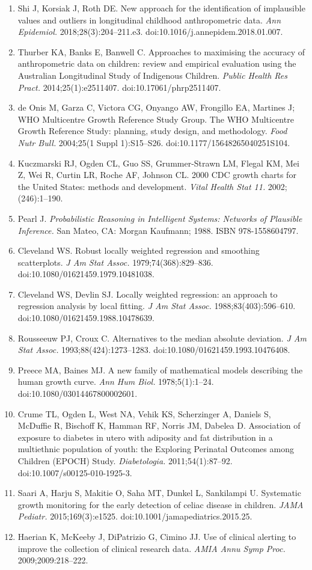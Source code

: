 \documentclass[11pt]{article}
\begin{document}
\begin{enumerate}
\item
  Shi J, Korsiak J, Roth DE. New approach for the identification of implausible values and outliers in longitudinal childhood anthropometric data. \emph{Ann Epidemiol.} 2018;28(3):204--211.e3. doi:10.1016/j.annepidem.2018.01.007.
\item
  Thurber KA, Banks E, Banwell C. Approaches to maximising the accuracy of anthropometric data on children: review and empirical evaluation using the Australian Longitudinal Study of Indigenous Children. \emph{Public Health Res Pract.} 2014;25(1):e2511407. doi:10.17061/phrp2511407.
\item
  de Onis M, Garza C, Victora CG, Onyango AW, Frongillo EA, Martines J; WHO Multicentre Growth Reference Study Group. The WHO Multicentre Growth Reference Study: planning, study design, and methodology. \emph{Food Nutr Bull.} 2004;25(1 Suppl 1):S15--S26. doi:10.1177/15648265040251S104.
\item
  Kuczmarski RJ, Ogden CL, Guo SS, Grummer-Strawn LM, Flegal KM, Mei Z, Wei R, Curtin LR, Roche AF, Johnson CL. 2000 CDC growth charts for the United States: methods and development. \emph{Vital Health Stat 11.} 2002;(246):1--190.
\item
  Pearl J. \emph{Probabilistic Reasoning in Intelligent Systems: Networks of Plausible Inference.} San Mateo, CA: Morgan Kaufmann; 1988. ISBN 978-1558604797.
\item
  Cleveland WS. Robust locally weighted regression and smoothing scatterplots. \emph{J Am Stat Assoc.} 1979;74(368):829--836. doi:10.1080/01621459.1979.10481038.
\item
  Cleveland WS, Devlin SJ. Locally weighted regression: an approach to regression analysis by local fitting. \emph{J Am Stat Assoc.} 1988;83(403):596--610. doi:10.1080/01621459.1988.10478639.
\item
  Rousseeuw PJ, Croux C. Alternatives to the median absolute deviation. \emph{J Am Stat Assoc.} 1993;88(424):1273--1283. doi:10.1080/01621459.1993.10476408.
\item
  Preece MA, Baines MJ. A new family of mathematical models describing the human growth curve. \emph{Ann Hum Biol.} 1978;5(1):1--24. doi:10.1080/03014467800002601.
\item
  Crume TL, Ogden L, West NA, Vehik KS, Scherzinger A, Daniels S, McDuffie R, Bischoff K, Hamman RF, Norris JM, Dabelea D. Association of exposure to diabetes in utero with adiposity and fat distribution in a multiethnic population of youth: the Exploring Perinatal Outcomes among Children (EPOCH) Study. \emph{Diabetologia.} 2011;54(1):87--92. doi:10.1007/s00125-010-1925-3.
\item
  Saari A, Harju S, Makitie O, Saha MT, Dunkel L, Sankilampi U. Systematic growth monitoring for the early detection of celiac disease in children. \emph{JAMA Pediatr.} 2015;169(3):e1525. doi:10.1001/jamapediatrics.2015.25.
\item
  Haerian K, McKeeby J, DiPatrizio G, Cimino JJ. Use of clinical alerting to improve the collection of clinical research data. \emph{AMIA Annu Symp Proc.} 2009;2009:218--222.
\end{enumerate}
\end{document}
